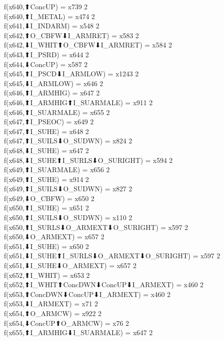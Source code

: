 f(x640,⬆ConcUP) = x739 {2} \\
f(x640,⬆I_METAL) = x474 {2} \\
f(x641,⬇I_INDARM) = x548 {2} \\
f(x642,⬆O_CBFW⬇I_ARMRET) = x583 {2} \\
f(x642,⬇I_WHIT⬆O_CBFW⬇I_ARMRET) = x584 {2} \\
f(x643,⬆I_PSRD) = x644 {2} \\
f(x644,⬇ConcUP) = x587 {2} \\
f(x645,⬆I_PSCD⬇I_ARMLOW) = x1243 {2} \\
f(x645,⬇I_ARMLOW) = x646 {2} \\
f(x646,⬆I_ARMHIG) = x647 {2} \\
f(x646,⬆I_ARMHIG⬆I_SUARMALE) = x911 {2} \\
f(x646,⬆I_SUARMALE) = x655 {2} \\
f(x647,⬆I_PSEOC) = x649 {2} \\
f(x647,⬆I_SUHE) = x648 {2} \\
f(x647,⬆I_SUILS⬇O_SUDWN) = x824 {2} \\
f(x648,⬇I_SUHE) = x647 {2} \\
f(x648,⬇I_SUHE⬆I_SURLS⬇O_SURIGHT) = x594 {2} \\
f(x649,⬆I_SUARMALE) = x656 {2} \\
f(x649,⬆I_SUHE) = x914 {2} \\
f(x649,⬆I_SUILS⬇O_SUDWN) = x827 {2} \\
f(x649,⬇O_CBFW) = x650 {2} \\
f(x650,⬆I_SUHE) = x651 {2} \\
f(x650,⬆I_SUILS⬇O_SUDWN) = x110 {2} \\
f(x650,⬆I_SURLS⬇O_ARMEXT⬇O_SURIGHT) = x597 {2} \\
f(x650,⬇O_ARMEXT) = x657 {2} \\
f(x651,⬇I_SUHE) = x650 {2} \\
f(x651,⬇I_SUHE⬆I_SURLS⬇O_ARMEXT⬇O_SURIGHT) = x597 {2} \\
f(x651,⬇I_SUHE⬇O_ARMEXT) = x657 {2} \\
f(x652,⬆I_WHIT) = x653 {2} \\
f(x652,⬆I_WHIT⬆ConcDWN⬇ConcUP⬇I_ARMEXT) = x460 {2} \\
f(x653,⬆ConcDWN⬇ConcUP⬇I_ARMEXT) = x460 {2} \\
f(x653,⬇I_ARMEXT) = x71 {2} \\
f(x654,⬆O_ARMCW) = x922 {2} \\
f(x654,⬇ConcUP⬆O_ARMCW) = x76 {2} \\
f(x655,⬆I_ARMHIG⬇I_SUARMALE) = x647 {2} \\
